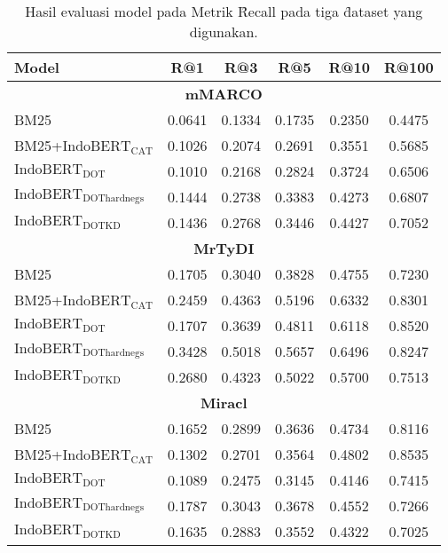 \newpage

\begin{table}
    \centering
    \caption{Hasil evaluasi model pada Metrik \f{Recall} pada tiga \f{dataset} yang digunakan.}
    \label{tab:evalrecall}
    \begin{tabular}{lccccc}
        \hline
        Model & R@1 & R@3 & R@5 & R@10 & R@100 \\ 
        \hline
        \multicolumn{6}{c}{\textbf{mMARCO}} \\
        BM25 & 0.0641 & 0.1334 & 0.1735 & 0.2350 & 0.4475 \\
        BM25+$\text{IndoBERT}_{\text{CAT}}$  & 0.1026 & 0.2074 & 0.2691 & 0.3551 & 0.5685 \\ 
        $\text{IndoBERT}_{\text{DOT}}$ & 0.1010 & 0.2168 & 0.2824 & 0.3724 & 0.6506 \\
        $\text{IndoBERT}_{\text{DOThardnegs}} $ & 0.1444 & 0.2738 & 0.3383 & 0.4273 & 0.6807 \\
        $\text{IndoBERT}_{\text{DOTKD}}$ & 0.1436 & 0.2768 & 0.3446 & 0.4427 & 0.7052 \\
        \hline
        \multicolumn{6}{c}{\textbf{MrTyDI}} \\
        BM25 & 0.1705 & 0.3040 & 0.3828 & 0.4755 & 0.7230 \\
        BM25+$\text{IndoBERT}_{\text{CAT}}$  & 0.2459& 0.4363 & 0.5196 & 0.6332 & 0.8301 \\
        $\text{IndoBERT}_{\text{DOT}}$ & 0.1707 & 0.3639 & 0.4811 & 0.6118 & 0.8520 \\
        $\text{IndoBERT}_{\text{DOThardnegs}} $ & 0.3428 & 0.5018 & 0.5657 & 0.6496 & 0.8247 \\
        $\text{IndoBERT}_{\text{DOTKD}}$ & 0.2680 & 0.4323 & 0.5022 & 0.5700 & 0.7513 \\
        \hline
        \multicolumn{6}{c}{\textbf{Miracl}} \\
        BM25 & 0.1652 & 0.2899 & 0.3636 & 0.4734 & 0.8116 \\
        BM25+$\text{IndoBERT}_{\text{CAT}}$  & 0.1302 & 0.2701 & 0.3564 & 0.4802 & 0.8535 \\
        $\text{IndoBERT}_{\text{DOT}}$ & 0.1089 & 0.2475 & 0.3145 & 0.4146 & 0.7415 \\
        $\text{IndoBERT}_{\text{DOThardnegs}} $ & 0.1787 & 0.3043 & 0.3678 & 0.4552 & 0.7266 \\
        $\text{IndoBERT}_{\text{DOTKD}}$ & 0.1635 & 0.2883 & 0.3552 & 0.4322 & 0.7025 \\
        \hline
        
        \end{tabular}
        
\end{table}


